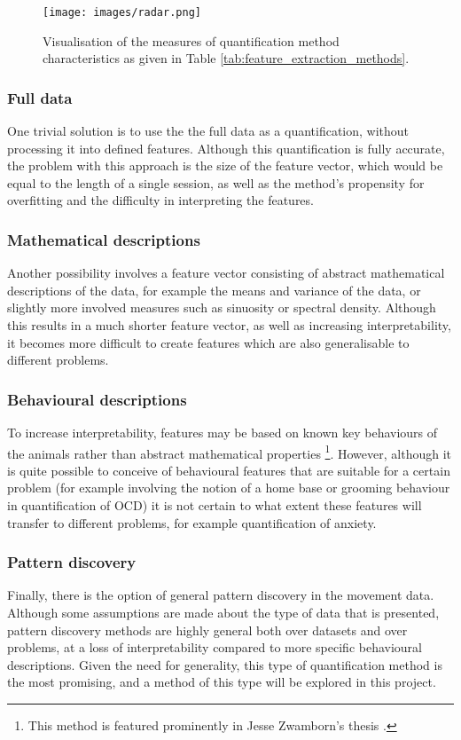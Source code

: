 \documentclass[conference,a4paper,twoside]{IEEEtran}
\begin{document}
\begin{figure}
    \centering
    \texttt{[image: images/radar.png]}
    \caption{Visualisation of the measures of quantification method characteristics as given in Table \ref{tab:feature_extraction_methods}.}
    \label{fig:radial}
\end{figure}

\subsubsection{Full data}
One trivial solution is to use the the full data as a quantification, without processing it into defined features. Although this quantification is fully accurate, the problem with this approach is the size of the feature vector, which would be equal to the length of a single session, as well as the method's propensity for overfitting and the difficulty in interpreting the features.

\subsubsection{Mathematical descriptions}
Another possibility involves a feature vector consisting of abstract mathematical descriptions of the data, for example the means and variance of the data, or slightly more involved measures such as sinuosity or spectral density. Although this results in a much shorter feature vector, as well as increasing interpretability, it becomes more difficult to create features which are also generalisable to different problems.

\subsubsection{Behavioural descriptions}
To increase interpretability, features may be based on known key behaviours of the animals rather than abstract mathematical properties \footnote{This method is featured prominently in Jesse Zwamborn's thesis \cite{jesse}.}. However, although it is quite possible to conceive of behavioural features that are suitable for a certain problem (for example involving the notion of a home base \cite{eilam1989home} or grooming behaviour in quantification of OCD) it is not certain to what extent these features will transfer to different problems, for example quantification of anxiety.

\subsubsection{Pattern discovery}
Finally, there is the option of general pattern discovery in the movement data. Although some assumptions are made about the type of data that is presented, pattern discovery methods are highly general both over datasets and over problems, at a loss of interpretability compared to more specific behavioural descriptions. Given the need for generality, this type of quantification method is the most promising, and a method of this type will be explored in this project.
\end{document}
